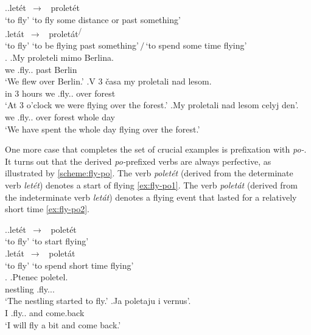 \ex.\label{scheme:fly-pro}\ag.let\'{e}t\textsuperscript{\IPF}~$\to$~ prolet\'{e}t\textsuperscript{\PF}\\
{`to fly'} {`to fly some distance or past something'}\\
\bg.let\'{a}t\textsuperscript{\IPF}~$\to$~ prolet\'{a}t\textsuperscript{\IPF\slash\PF} \\
{`to fly'} {`to be flying past something'\,$/$\,`to spend some time flying'}\\

\ex.\label{ex:fly-pro}
\ag.\label{ex:fly-pro1}My proleteli\textsuperscript{\PF} mimo Berlina.\\
we .fly.. past Berlin\\
\trans `We flew over Berlin.'
\bg.\label{ex:fly-pro2}V 3 \v{c}asa my proletali\textsuperscript{\IPF} nad lesom.\\
in 3 hours we .fly.. over forest\\
\trans `At 3 o'clock we were flying over the forest.'
\bg.\label{ex:fly-pro3}My proletali\textsuperscript{\PF} nad lesom celyj den'.\\
we .fly.. over forest whole day\\
\trans `We have spent the whole day flying over the forest.'

One more case that completes the set of crucial examples is prefixation with \textit{po-}. It turns out that the derived \textit{po-}prefixed verbs are always perfective, as illustrated by \ref{scheme:fly-po}. The verb \textit{polet\'{e}t\textsuperscript{\PF}} (derived from the determinate verb \textit{let\'{e}t\textsuperscript{\IPF}}) denotes a start of flying \ref{ex:fly-po1}. The verb \textit{polet\'{a}t\textsuperscript{\PF}} (derived from the indeterminate verb \textit{let\'{a}t\textsuperscript{\IPF}}) denotes a flying event that lasted for a relatively short time \ref{ex:fly-po2}.

\ex.\label{scheme:fly-po}\ag.let\'{e}t\textsuperscript{\IPF}~$\to$~ polet\'{e}t\textsuperscript{\PF}\\
{`to fly'} {`to start flying'}\\
\bg.let\'{a}t\textsuperscript{\IPF}~$\to$~ polet\'{a}t\textsuperscript{\PF}\\
{`to fly'} {`to spend short time flying'}\\

\ex.\label{ex:fly-po}
\ag.\label{ex:fly-po1}Ptenec poletel.\\
nestling .fly...\\
\trans `The nestling started to fly.'
\bg.\label{ex:fly-po2}Ja poletaju i vernus'.\\
I .fly.. and come.back\\
\trans `I will fly a bit and come back.'

